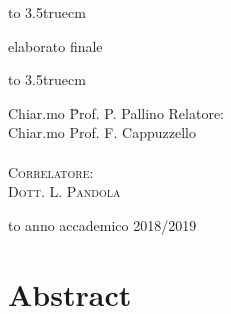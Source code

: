 \documentclass[10pt,foldmark,notumble]{leaflet}
\begin{document}
\begin{center}
\centerline{\hbox to 3.5truecm{\hrulefill}}
{\sc elaborato finale}\\
\centerline{\hbox to 3.5truecm{\hrulefill}}

\vfill

\begin{minipage}{\textwidth}
\begin{flushright}
\begin{minipage}{0.3\textwidth}
\begin{tabbing}
Chiar.mo \= Prof. P. Pallino \kill
Relatore: \> \\
Chiar.mo \> Prof. F. Cappuzzello \\
\\
\textsc{Correlatore:} \\
\textsc{Dott. L. Pandola}
\end{tabbing}
\end{minipage}
\end{flushright}
\end{minipage}

\vfill

\hbox to \textwidth{\hrulefill}
{\sc anno accademico 2018/2019}

\end{center}

\newpage

\section{Abstract}
\end{document}
